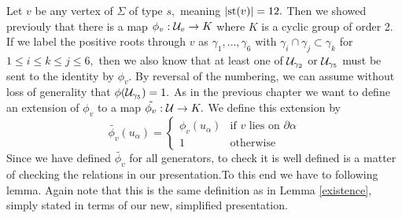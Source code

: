 \documentclass[class=book, crop=false]{standalone}
\begin{document}
Let $v$ be any vertex of $\Sigma$ of type $s,$ meaning $|\mathrm{st}(v)|=12.$ Then we showed previouly that there is a map $\phi_v:\mathcal{U}_v\to K$ where $K$ is a cyclic group of order 2. If we label the positive roots through $v$ as  $\gamma_1,\dots,\gamma_6$ with $\gamma_i\cap \gamma_j\subset \gamma_k$ for $1\le i\le k\le j\le 6,$ then we also know that at least one of $\mathcal{U}_{\gamma_2}$ or $\mathcal{U}_{\gamma_5}$ must be sent to the identity by $\phi_v.$ By reversal of the numbering, we can assume without loss of generality that $\phi(\mathcal{U}_{\gamma_5})=1.$ As in the previous chapter we want to define an extension of $\phi_v$ to a map $\tilde{\phi_v}:\mathcal{U}\to K.$ We define this extension by
\[
	\tilde{\phi_v}(u_\alpha)=\begin{cases}\phi_v(u_\alpha)&\text{if }v\text{ lies on }\partial\alpha\\1&\text{otherwise}
	\end{cases}
	\]
	Since we have defined $\tilde{\phi_v}$ for all generators, to check it is well defined is a matter of checking the relations in our presentation.To this end we have to following lemma. Again note that this is the same definition as in Lemma \ref{existence}, simply stated in terms of our new, simplified presentation.
\end{document}

